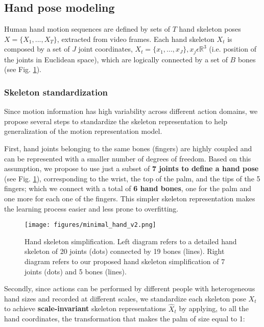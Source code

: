 \documentclass[letterpaper, 10 pt, conference]{ieeeconf}
\begin{document}
\subsection{Hand pose modeling}\label{sec:hand_modeling}

Human hand motion sequences are defined by sets of \(T\) hand skeleton poses \(X=\{X_1, ..., X_T\}\), extracted from video frames. 
Each hand skeleton \(X_t\) is composed by a set of \(J\) joint coordinates, $X_t = \{x_1, ..., x_J \}, x_j \epsilon \mathbb{R}^3$ (i.e. position of the joints in Euclidean space), which are logically connected by a set of \(B\) bones 
(see Fig. \ref{fig:min_hand}). 



\subsubsection{Skeleton standardization}
Since motion information has high variability across different action domains, we propose several steps to standardize the skeleton representation to help generalization of the motion representation model.


First, hand joints belonging to the same bones (fingers) are highly coupled and can be represented with a smaller number of degrees of freedom.
Based on this assumption, we propose to use just a subset of \textbf{7 joints to define a hand pose} (see Fig. \ref{fig:min_hand}), corresponding to the wrist, the top of the palm, and the tips of the 5 fingers; which we connect with a total of \textbf{6 hand bones}, one for the palm and one more for each one of the fingers. 
This simpler skeleton representation makes the learning process easier and less prone to overfitting.

\begin{figure}
    \centering
    \texttt{[image: figures/minimal\_hand\_v2.png]}
    \caption{Hand skeleton simplification. Left diagram refers to a detailed hand skeleton of 20 joints (dots) connected by 19 bones (lines). Right diagram refers to our proposed hand skeleton simplification of 7 joints (dots) and 5 bones (lines).
    }
    \label{fig:min_hand}
\end{figure}


Secondly, since actions can be performed by different people with heterogeneous hand sizes and recorded at different scales, we standardize each skeleton pose \(X_t\) to achieve \textbf{scale-invariant} skeleton representations \(\hat{X}_t\) by applying, to all the hand coordinates, the transformation that makes the palm of size equal to 1: 
\end{document}
